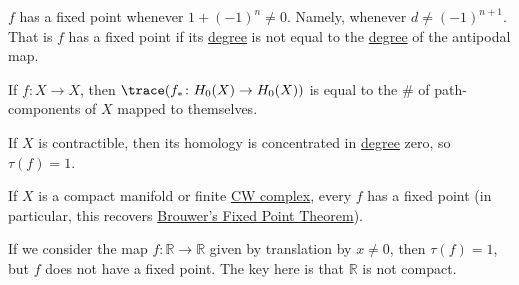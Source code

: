 \begin{corollary}
	\(f\) has a fixed point whenever \(1 + (-1)^n \neq 0\). Namely, whenever \(d \neq (-1)^{n + 1}\). That is \(f\) has a fixed point if its
	\hyperref[def:degree]{degree} is not equal to the \hyperref[def:degree]{degree} of the antipodal map.
\end{corollary}

\begin{exercise}
	If \(f \colon X \to X\), then \(\trace(f_\ast \colon H_0(X) \to H_0(X))\) is equal to the \# of path-components of \(X\) mapped to themselves.
\end{exercise}

\begin{exercise}
	If \(X\) is contractible, then its homology is concentrated in \hyperref[def:degree]{degree} zero, so \(\tau(f) = 1\).

	If \(X\) is a compact manifold or finite \hyperref[def:CW-Complex]{CW complex}, every \(f\) has a fixed point (in particular,
	this recovers \hyperref[thm:Brouwer-fixed-point]{Brouwer's Fixed Point Theorem}).
\end{exercise}

\begin{eg}
	If we consider the map \(f \colon \mathbb{R} \to \mathbb{R}\) given by translation by \(x \neq 0\), then \(\tau(f) = 1\), but \(f\) does not have a fixed point.
	The key here is that \(\mathbb{R}\) is not compact.
\end{eg}

